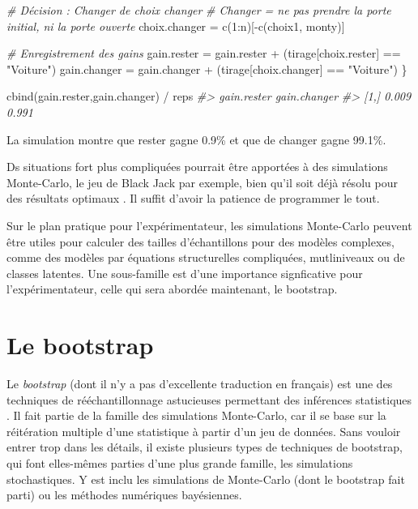 \documentclass[
]{book}
\newenvironment{Shaded}{}{}
\newcommand{\CommentTok}[1]{\textit{#1}}
\newcommand{\DecValTok}[1]{#1}
\newcommand{\FunctionTok}[1]{#1}
\newcommand{\NormalTok}[1]{#1}
\newcommand{\OtherTok}[1]{#1}
\newcommand{\SpecialCharTok}[1]{#1}
\newcommand{\StringTok}[1]{#1}
\begin{document}
\begin{Shaded}
\begin{Highlighting}[]
  \CommentTok{\# Décision : Changer de choix changer}
  \CommentTok{\# Changer = ne pas prendre la porte initial, ni la porte ouverte}
\NormalTok{  choix.changer }\OtherTok{=} \FunctionTok{c}\NormalTok{(}\DecValTok{1}\SpecialCharTok{:}\NormalTok{n)[}\SpecialCharTok{{-}}\FunctionTok{c}\NormalTok{(choix1, monty)]}

  \CommentTok{\# Enregistrement des gains}
\NormalTok{  gain.rester }\OtherTok{=}\NormalTok{ gain.rester }\SpecialCharTok{+}\NormalTok{ (tirage[choix.rester] }\SpecialCharTok{==} \StringTok{"Voiture"}\NormalTok{)}
\NormalTok{  gain.changer }\OtherTok{=}\NormalTok{ gain.changer }\SpecialCharTok{+}\NormalTok{ (tirage[choix.changer] }\SpecialCharTok{==} \StringTok{"Voiture"}\NormalTok{)}
\NormalTok{\}}

\FunctionTok{cbind}\NormalTok{(gain.rester,gain.changer)  }\SpecialCharTok{/}\NormalTok{ reps}
\CommentTok{\#\textgreater{}      gain.rester gain.changer}
\CommentTok{\#\textgreater{} [1,]       0.009        0.991}
\end{Highlighting}
\end{Shaded}

La simulation montre que rester gagne 0.9\% et que de changer gagne 99.1\%.

Ds situations fort plus compliquées pourrait être apportées à des simulations Monte-Carlo, le jeu de Black Jack par exemple, bien qu'il soit déjà résolu pour des résultats optimaux \autocite{Millman83}. Il suffit d'avoir la patience de programmer le tout.

Sur le plan pratique pour l'expérimentateur, les simulations Monte-Carlo peuvent être utiles pour calculer des tailles d'échantillons pour des modèles complexes, comme des modèles par équations structurelles compliquées, mutliniveaux ou de classes latentes. Une sous-famille est d'une importance signficative pour l'expérimentateur, celle qui sera abordée maintenant, le bootstrap.

\hypertarget{le-bootstrap}{%
\section{Le bootstrap}\label{le-bootstrap}}

Le \emph{bootstrap} (dont il n'y a pas d'excellente traduction en français) est une des techniques de rééchantillonnage astucieuses permettant des inférences statistiques \autocite{Efron79}. Il fait partie de la famille des simulations Monte-Carlo, car il se base sur la réitération multiple d'une statistique à partir d'un jeu de données. Sans vouloir entrer trop dans les détails, il existe plusieurs types de techniques de bootstrap, qui font elles-mêmes parties d'une plus grande famille, les simulations stochastiques. Y est inclu les simulations de Monte-Carlo (dont le bootstrap fait parti) ou les méthodes numériques bayésiennes.
\end{document}
